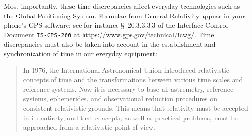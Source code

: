 \documentclass[a4paper,12pt,%
onecolumn,oneside,%
british%
]{memoir}
\renewcommand*{\|}[1][]{\nonscript\:#1\vert\nonscript\:\mathopen{}}
\newcommand*{\sect}{\S}%
\begin{document}
Most importantly, these time discrepancies affect everyday technologies such as the Global Positioning System. Formulae from General Relativity appear in your phone's GPS software; see for instance \sect~20.3.3.3.3 of the Interface Control Document \texttt{IS-GPS-200} at \url{https://www.gps.gov/technical/icwg/}. Time discrepancies must also be taken into account in the establishment and synchronization of time in our everyday equipment:
\begin{quote}\footnotesize
  In 1976, the International Astronomical Union introduced relativistic concepts of time and the transformations between various time scales and reference systems. \textelp{} Now \textelp{} it is necessary to base all astrometry, reference systems, ephemerides, and observational reduction procedures on consistent relativistic grounds. This means that relativity must be accepted in its entirety, and that concepts, as well as practical problems, must be approached from a relativistic point of view.
\end{quote}
%
\end{document}
